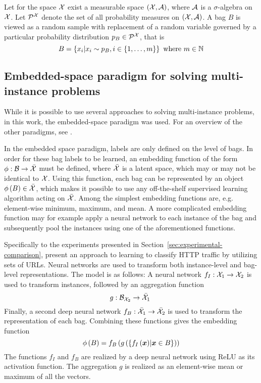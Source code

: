Let for the space \( \mathcal{X} \) exist a measurable space \( \left( \mathcal{X}, \mathcal{A} \right) \), where \( \mathcal{A} \) is a \( \sigma \)-algebra on \( \mathcal{X} \). Let \( \mathcal{P}^\mathspace{X} \) denote the set of all probability measures on \( \left( \mathcal{X}, \mathcal{A} \right) \). A bag \( B \) is viewed as a random sample with replacement of a random variable governed by a particular probability distribution \( p_B \in \mathcal{P}^\mathspace{X} \), that is
\[ B = \left\{ x_i \middle| x_i \sim p_B, i \in \left\{ 1, \dots, m \right\} \right\} \ \text{where} \ m \in \mathbb{N}\]

\subsection{Embedded-space paradigm for solving multi-instance problems}\label{sec:embedded-space-paradigm}
While it is possible to use several approaches to solving multi-instance problems, in this work, the embedded-space paradigm was used. For an overview of the other paradigms, see \cite{dedic_optimalization_2020}.

In the embedded space paradigm, labels are only defined on the level of bags. In order for these bag labels to be learned, an embedding function of the form \( \phi : \mathcal{B} \to \bar{\mathcal{X}} \) must be defined, where \( \bar{\mathcal{X}} \) is a latent space, which may or may not be identical to \( \mathcal{X} \). Using this function, each bag can be represented by an object \( \phi \left( B \right) \in \bar{\mathcal{X}} \), which makes it possible to use any off-the-shelf supervised learning algorithm acting on \( \bar{\mathcal{X}} \). Among the simplest embedding functions are, e.g. element-wise minimum, maximum, and mean. A more complicated embedding function may for example apply a neural network to each instance of the bag and subsequently pool the instances using one of the aforementioned functions.

Specifically to the experiments presented in Section~\ref{sec:experimental-comparison}, \cite{pevny_nested_2020} present an approach to learning to classify HTTP traffic by utilizing sets of URLs. Neural networks are used to transform both instance-level and bag-level representations. The model is as follows: A neural network \( f_I : \mathcal{X}_1 \to \mathcal{X}_2 \) is used to transform instances, followed by an aggregation function
\[ g: \mathcal{B}_{\mathcal{X}_2} \to \bar{\mathcal{X}}_1 \ \]
Finally, a second deep neural network \( f_B : \bar{\mathcal{X}}_1 \to \bar{\mathcal{X}}_2 \) is used to transform the representation of each bag. Combining these functions gives the embedding function
\[ \phi \left( B \right) = f_B \left( g \left( \left\{ f_I \left( \bm{x} \right) \middle| \bm{x} \in B \right\} \right) \right) \]
The functions \( f_I \) and \( f_B \) are realized by a deep neural network using ReLU as its activation function. The aggregation \( g \) is realized as an element-wise mean or maximum of all the vectors.

